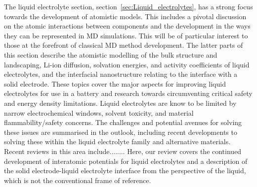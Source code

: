 \documentclass[../main.tex]{subfiles}
\begin{document}
The liquid electrolyte section, section~\ref{sec:Liquid_electrolytes}, has a strong focus towards the development of atomistic models. This includes a pivotal discussion on the atomic interactions between components and the development in the ways they can be represented in MD simulations. This will be of particular interest to those at the forefront of classical MD method development. The latter parts of this section describe the atomistic modelling of the bulk structure and landscaping, Li-ion diffusion, solvation energies, and activity coefficients of liquid electrolytes, and the interfacial nanostructure relating to the interface with a solid electrode. These topics cover the major aspects for improving liquid electrolytes for use in a battery and research towards circumventing critical safety\cite{Shepherd_Siddiqui, Pfrang2017} and energy density\cite{Liu2019_e_den} limitations. Liquid electrolytes are know to be limited by narrow electrochemical windows, solvent toxicity, and material flammability/safety concerns. The challenges and potential avenues for solving these issues are summarised in the outlook, including recent developments to solving these within the liquid electrolyte family and alternative materials. Recent reviews in this area include........ Here, our review covers the continued development of interatomic potentials for liquid electrolytes and a description of the solid electrode-liquid electrolyte interface from the perspective of the liquid, which is not the conventional frame of reference.
\end{document}
